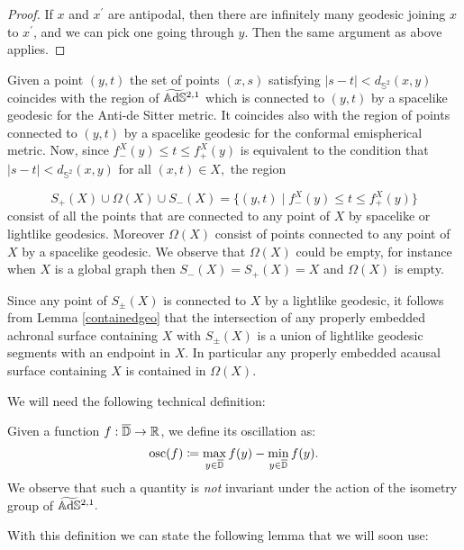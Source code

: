 \begin{proof}
       If $x$ and $x^{\prime}$ are antipodal, then there are infinitely many geodesic joining $x$ to $x^{\prime}$, and we can pick one going through $y$. Then the same argument as above applies. 
\end{proof}

\begin{observation}\label{423}
    Given a point $(y,t)$ the set of points $(x,s)$ satisfying $\lvert s-t \rvert<d_{\mathbb{S}^2}(x,y)$ coincides with the region of $\widetilde{\mathbb{A}\mathrm{d}\mathbb{S}}{}^{2,1}$ which is connected to $(y,t)$ by a spacelike geodesic for the Anti-de Sitter metric. It coincides also with the region of points connected to $(y,t)$ by a spacelike geodesic for the conformal emispherical metric. Now, since $f_-^X(y)\leq t\leq f_+^X(y)$ is equivalent to the condition that $\lvert s-t \rvert<d_{\mathbb{S}^2}(x,y)$ for all $(x,t)\in X,$ the region 

    \[
        S_+(X)\cup\Omega(X)\cup S_-(X)=\{(y,t)\;|\; f_-^X(y)\leq t\leq f_+^X(y)\}
    \]
    consist of all the points that are connected to any point of $X$ by spacelike or lightlike geodesics. Moreover $\Omega(X)$ consist of points connected to any point of $X$ by a spacelike geodesic. We observe that $\Omega(X)$ could be empty, for instance when $X$ is a global graph then $S_-(X)=S_+(X)=X$ and $\Omega(X)$ is empty.
\end{observation}

\begin{observation}
    Since any point of $S_\pm(X)$ is connected to $X$ by a lightlike geodesic, it follows from Lemma \ref{containedgeo} that the intersection of any properly embedded achronal surface containing $X$ with $S_\pm(X)$ is a union of lightlike geodesic segments with an endpoint in $X$. In particular any properly embedded acausal surface containing $X$ is contained in $\Omega(X).$
\end{observation}

We will need the following technical definition: 

\begin{definition}
    Given a function $f:\overline{\mathbb{D}}\to\mathbb{R}$, we define its oscillation as: 
    \[
        \text{osc}(f)\coloneqq \max_{y\in\overline{\mathbb{D}}}f(y)-\min_{y\in\overline{\mathbb{D}}}f(y).
    \]
    We observe that such a quantity is \textit{not} invariant under the action of the isometry group of $\widetilde{\mathbb{A}\mathrm{d}\mathbb{S}}{}^{2,1}.$
\end{definition}

With this definition we can state the following lemma that we will soon use: 

